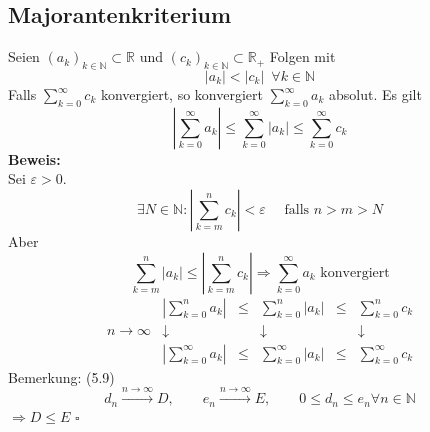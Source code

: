 \subsection{Majorantenkriterium} %
\label{sub:majorantenkriterium}
Seien $(a_k)_{k \in \mathds{N}} \subset \mathds{R}$ und $(c_k)_{k \in \mathds{N}} \subset \mathds{R}_+$ Folgen mit 
\[
	|a_k| < |c_k| \enspace \forall k \in \mathds{N}
\]
Falls $\sum\limits_{k=0}^{\infty} c_k$ konvergiert, so konvergiert $\sum\limits_{k=0}^{\infty} a_k$ absolut. Es gilt
\[
	\left|\sum\limits_{k=0}^{\infty} a_k\right| \leq \sum\limits_{k=0}^{\infty} |a_k| \leq \sum\limits_{k=0}^{\infty} c_k
\]
\textbf{Beweis:} \\
Sei $\varepsilon >0$.
\[
	\exists N \in \mathds{N} : \left| \sum\limits_{k=m}^{n} c_k\right| < \varepsilon \quad \text{ falls } n>m>N \tag{Cauchy-Kriterium}
\]
Aber
\[
	\sum\limits_{k=m}^{n} |a_k| \leq \left|\sum\limits_{k=m}^{n} c_k\right| 
	\Rightarrow \sum\limits_{k=0}^{\infty} a_k \text{ konvergiert}
\]
\[
	\begin{array}{rccccc}
	&\left|\sum\limits_{k=0}^{n} a_k\right| & \leq & \sum\limits_{k=0}^{n} |a_k| & \leq & \sum\limits_{k=0}^{n} c_k \\
	n \to \infty & \downarrow & & \downarrow  & & \downarrow \\
	&\left|\sum\limits_{k=0}^{\infty} a_k\right| & \leq & \sum\limits_{k=0}^{\infty} |a_k| & \leq & \sum\limits_{k=0}^{\infty} c_k
	\end{array}
\]
Bemerkung: (5.9) \\
\[
	d_n \xrightarrow{n \to \infty} D, \qquad e_n \xrightarrow{n \to \infty} E, 
	\qquad 0 \leq d_n \leq e_n \forall n \in \mathds{N} 
\]
$\Rightarrow D \leq E$ \hfill $\square$

